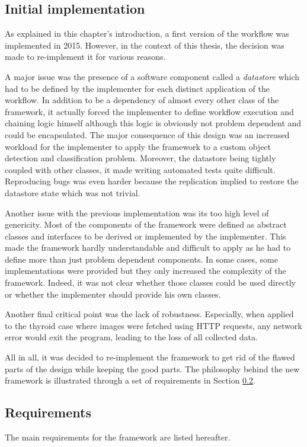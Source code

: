 \subsection{Initial implementation}
\label{ssec:work_init_impl}
As explained in this chapter's introduction, a first version of the workflow was implemented in 2015. However, in the context of this thesis, the decision was made to re-implement it for various reasons.

A major issue was the presence of a software component called a \textit{datastore} which had to be defined by the implementer for each distinct application of the workflow. In addition to be a dependency of almost every other class of the framework, it actually forced the implementer to define workflow execution and chaining logic himself although this logic is obviously not problem dependent and could be encapsulated. The major consequence of this design was an increased workload for the implementer to apply the framework to a custom object detection and classification problem. Moreover, the datastore being tightly coupled with other classes, it made writing automated tests quite difficult. Reproducing bugs was even harder because the replication implied to restore the datastore state which was not trivial. 

Another issue with the previous implementation was its too high level of genericity. Most of the components of the framework were defined as abstract classes and interfaces to be derived or implemented by the implementer. This made the framework hardly understandable and difficult to apply as he had to define more than just problem dependent components. In some cases, some implementations were provided but they only increased the complexity of the framework. Indeed, it was not clear whether those classes could be used directly or whether the implementer should provide his own classes.

Another final critical point was the lack of robustness. Especially, when applied to the thyroid case where images were fetched using HTTP requests, any network error would exit the program, leading to the loss of all collected data.

All in all, it was decided to re-implement the framework to get rid of the flawed parts of the design while keeping the good parts. The philosophy behind the new framework is illustrated through a set of requirements in Section \ref{ssec:work_requirements}.

\subsection{Requirements}
\label{ssec:work_requirements}
The main requirements for the framework are listed hereafter.

